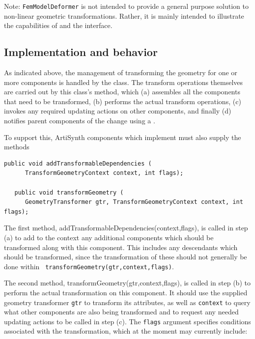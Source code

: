 \begin{sideblock}
Note: {\tt FemModelDeformer} is not intended to provide a general
purpose solution to non-linear geometric transformations. Rather, it
is mainly intended to illustrate the capabilities of
 and the
 interface.
\end{sideblock}

\subsection{Implementation and behavior}

As indicated above, the management of transforming the geometry for one
or more components is handled by the
 class.
The transform operations themselves are carried out by this class's
method, which (a) assembles all the components that need
to be transformed, (b) performs the actual transform operations,
(c) invokes any required updating actions on other components,
and finally (d) notifies parent components of the change using
a .

To support this, ArtiSynth components which implement
must also supply the methods
%
\begin{lstlisting}[]
   public void addTransformableDependencies (
      TransformGeometryContext context, int flags);

   public void transformGeometry (
      GeometryTransformer gtr, TransformGeometryContext context, int flags);
\end{lstlisting}
%
The first method,
%
{addTransformableDependencies(context,flags)}, 
is called in step (a) to add to the context any additional components
which should be transformed along with this component. This includes
any descendants which should be transformed, since the
transformation of these should not generally be done within {\tt
transformGeometry(gtr,context,flags)}.

The second method, 
%
{transformGeometry(gtr,context,flags)}, is
called in step (b) to perform the actual transformation on this
component.  It should use the supplied geometry transformer {\tt gtr}
to transform its attributes, as well as {\tt context} to query what
other components are also being transformed and to request
any needed updating actions to be called in step (c).  The {\tt flags} argument
specifies conditions associated with the transformation, which at the
moment may currently include:

